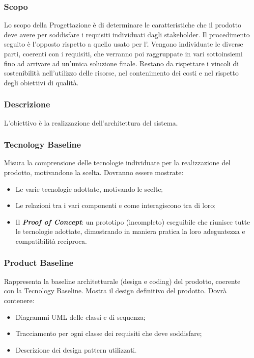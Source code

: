 \subsubsection{Scopo}
Lo scopo della Progettazione è di determinare le caratteristiche che il prodotto deve avere per soddisfare i requisiti individuati dagli stakeholder. Il procedimento seguito è l'opposto rispetto a quello usato per l'\AdR. Vengono individuate le diverse parti, coerenti con i requisiti, che verranno poi raggruppate in vari sottoinsiemi fino ad arrivare ad un'unica soluzione finale. Restano da rispettare i vincoli di sostenibilità nell'utilizzo delle risorse, nel contenimento dei costi e nel rispetto degli obiettivi di qualità.

\subsubsection{Descrizione}
L’obiettivo è la realizzazione dell’architettura del sistema.

\subsubsection{Tecnology Baseline}
Misura la comprensione delle tecnologie individuate per la realizzazione del prodotto, motivandone la scelta. 
Dovranno essere mostrate:
\begin{itemize}
	\item Le varie tecnologie adottate, motivando le scelte;
	\item Le relazioni tra i vari componenti e come interagiscono tra di loro;
	\item Il \textit{\textbf{Proof of Concept}}: un prototipo (incompleto) eseguibile che riunisce tutte le tecnologie adottate, dimostrando in maniera pratica la loro adeguatezza e compatibilità reciproca. 
\end{itemize}

\subsubsection{Product Baseline}
Rappresenta la baseline architetturale (design e coding) del prodotto, coerente con la Tecnology Baseline. Mostra il design definitivo del prodotto.
Dovrà contenere:
\begin{itemize}
	\item Diagrammi UML delle classi e di sequenza;
	\item Tracciamento per ogni classe dei requisiti che deve soddisfare;
	\item Descrizione dei design pattern utilizzati.
\end{itemize}

